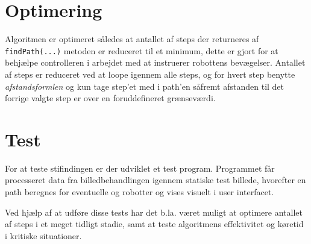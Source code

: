 \section{Optimering}
Algoritmen er optimeret således at antallet af steps der returneres af \texttt{findPath(...)} metoden er reduceret til et minimum, dette er gjort for at behjælpe controlleren i arbejdet med at instruerer robottens bevægelser. Antallet af steps er reduceret ved at loope igennem alle steps, og for hvert step benytte \textit{afstandsformlen} og kun tage step'et med i path'en såfremt afstanden til det forrige valgte step er over en foruddefineret grænseværdi.

\section{Test}
For at teste stifindingen er der udviklet et test program. Programmet får processeret data fra billedbehandlingen igennem statiske test billede, hvorefter en path beregnes for eventuelle og robotter og vises visuelt i user interfacet.

Ved hjælp af at udføre disse tests har det b.la. været muligt at optimere antallet af steps i et meget tidligt stadie, samt at teste algoritmens effektivitet og køretid i kritiske situationer.